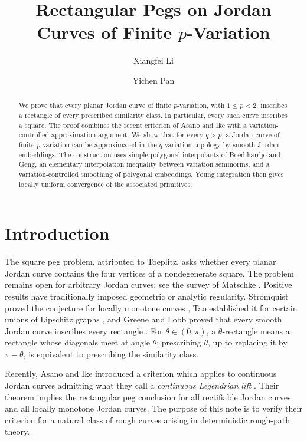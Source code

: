 \documentclass[11pt,reqno]{amsart}
\title[Rectangular pegs on finite-variation Jordan curves]
{Rectangular Pegs on Jordan Curves of Finite \(p\)-Variation}
\author{Xiangfei Li}
\author{Yichen Pan}
\theoremstyle{definition}
\theoremstyle{remark}
\begin{document}
\begin{abstract}
We prove that every planar Jordan curve of finite \(p\)-variation, with
\(1\leq p<2\), inscribes a rectangle of every prescribed similarity class.
In particular, every such curve inscribes a square.  The proof combines the
recent criterion of Asano and Ike with a
variation-controlled approximation argument.  We show that for every
\(q>p\), a Jordan curve of finite \(p\)-variation can be approximated in the
\(q\)-variation topology by smooth Jordan embeddings.  The construction uses
simple polygonal interpolants of Boedihardjo and Geng, an elementary
interpolation inequality between variation seminorms, and a
variation-controlled smoothing of polygonal embeddings.  Young integration
then gives locally uniform convergence of the associated primitives.  


\end{abstract}

\maketitle

\section{Introduction}

The square peg problem, attributed to Toeplitz, asks whether every planar
Jordan curve contains the four vertices of a nondegenerate square.  The
problem remains open for arbitrary Jordan curves; see the survey of Matschke
\cite{Matschke2014}.  Positive results have traditionally imposed geometric
or analytic regularity.  Stromquist proved the conjecture for locally
monotone curves \cite{Stromquist1989}, Tao established it for certain unions
of Lipschitz graphs \cite{Tao2017}, and Greene and Lobb proved that every
smooth Jordan curve inscribes every rectangle \cite{GreeneLobb2021}.
For \(\theta\in(0,\pi)\), a \(\theta\)-rectangle means a rectangle whose
diagonals meet at angle \(\theta\); prescribing \(\theta\), up to replacing it
by \(\pi-\theta\), is equivalent to prescribing the similarity class.

Recently, Asano and Ike introduced a  criterion
which applies to continuous Jordan curves admitting what they call a
\emph{continuous Legendrian lift} \cite{AsanoIke}.  Their theorem implies the
rectangular peg conclusion for all rectifiable Jordan curves and all locally
monotone Jordan curves.  The purpose of this note is to verify their criterion
for a natural class of rough curves arising in deterministic rough-path
theory.
\end{document}
